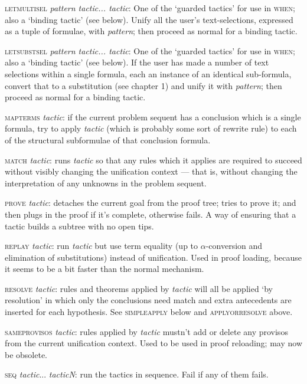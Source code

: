 \textsc{letmultisel} \textit{pattern tactic... tactic}: One of the `guarded tactics' for use in \textsc{when}; also a `binding tactic' (see below). Unify all the user's text-selections, expressed as a tuple of formulae, with \textit{pattern}; then proceed as normal for a binding tactic.


\textsc{letsubstsel} \textit{pattern tactic... tactic}: One of the `guarded tactics' for use in \textsc{when}; also a `binding tactic' (see below). If the user has made a number of text selections within a single formula, each an instance of an identical sub-formula, convert that to a substitution (see chapter 1) and unify it with \textit{pattern}; then proceed as normal for a binding tactic.


\textsc{mapterms} \textit{tactic}: if the current problem sequent has a conclusion which is a single formula, try to apply \textit{tactic} (which is probably some sort of rewrite rule) to each of the structural subformulae of that conclusion formula.

\textsc{match} \textit{tactic}: runs \textit{tactic} so that any rules which it applies are required to succeed without visibly changing the unification context --- that is, without changing the interpretation of any unknowns in the problem sequent.

\textsc{prove} \textit{tactic}: detaches the current goal from the proof tree; tries to prove it; and then plugs in the proof if it's complete, otherwise fails. A way of ensuring that a tactic builds a subtree with no open tips.

\textsc{replay} \textit{tactic}: run \textit{tactic} but use term equality (up to \ensuremath{\alpha}-conversion and elimination of substitutions) instead of unification. Used in proof loading, because it seems to be a bit faster than the normal mechanism.

\textsc{resolve} \textit{tactic}: rules and theorems applied by \textit{tactic} will all be applied `by resolution' in which only the conclusions need match and extra antecedents are inserted for each hypothesis. See \textsc{simpleapply} below and \textsc{applyorresolve} above.


\textsc{sameprovisos} \textit{tactic}: rules applied by \textit{tactic} mustn't add or delete any provisos from the current unification context. Used to be used in proof reloading; may now be obsolete.


\textsc{seq} \textit{tactic}... \textit{tacticN}: run the tactics in sequence. Fail if any of them fails.


